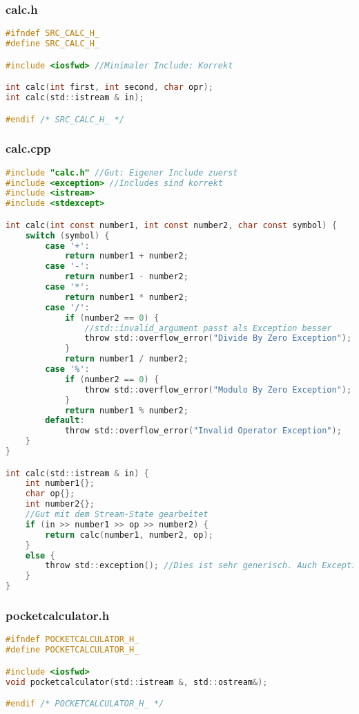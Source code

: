 \subsubsection{calc.h}
\begin{lstlisting}[style=frame, style= linenumbers, language=C]
#ifndef SRC_CALC_H_
#define SRC_CALC_H_

#include <iosfwd> //Minimaler Include: Korrekt

int calc(int first, int second, char opr);
int calc(std::istream & in);

#endif /* SRC_CALC_H_ */
\end{lstlisting}

\subsubsection{calc.cpp}
\begin{lstlisting}[style=frame, style= linenumbers, language=C]
#include "calc.h" //Gut: Eigener Include zuerst
#include <exception> //Includes sind korrekt
#include <istream>
#include <stdexcept>

int calc(int const number1, int const number2, char const symbol) {
	switch (symbol) {
		case '+':
			return number1 + number2;
		case '-':
			return number1 - number2;
		case '*':
			return number1 * number2;
		case '/':
			if (number2 == 0) {
				//std::invalid_argument passt als Exception besser
				throw std::overflow_error("Divide By Zero Exception"); //Auch Exceptions mit {} initialisiseren.
			}
			return number1 / number2;
		case '%':
			if (number2 == 0) {
				throw std::overflow_error("Modulo By Zero Exception");
			}
			return number1 % number2;
		default:
			throw std::overflow_error("Invalid Operator Exception");
	}
}

int calc(std::istream & in) {
	int number1{};
	char op{};
	int number2{};
	//Gut mit dem Stream-State gearbeitet
	if (in >> number1 >> op >> number2) {
		return calc(number1, number2, op);
	}
	else {
		throw std::exception(); //Dies ist sehr generisch. Auch Exceptions mit {} initialisiseren.
	}
}
\end{lstlisting}

\subsubsection{pocketcalculator.h}
\begin{lstlisting}[style=frame, style= linenumbers, language=C]
#ifndef POCKETCALCULATOR_H_
#define POCKETCALCULATOR_H_

#include <iosfwd>
void pocketcalculator(std::istream &, std::ostream&);

#endif /* POCKETCALCULATOR_H_ */
\end{lstlisting}

